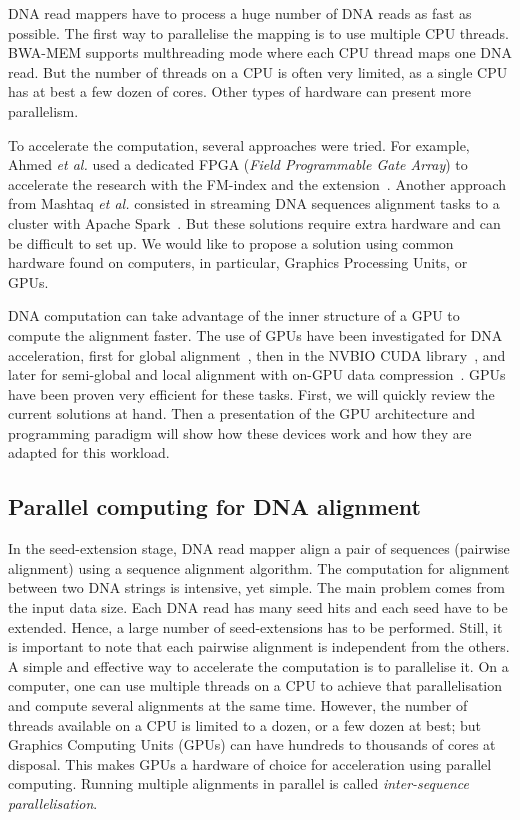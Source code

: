 DNA read mappers have to process a huge number of DNA reads as fast as possible. The first way to parallelise the mapping is to use multiple CPU threads. BWA-MEM supports multhreading mode where each CPU thread maps one DNA read. But the number of threads on a CPU is often very limited, as a single CPU has at best a few dozen of cores. Other types of hardware can present more parallelism.

To accelerate the computation, several approaches were tried. For example, Ahmed \emph{et al.} used a dedicated FPGA (\emph{Field Programmable Gate Array}) to accelerate the research with the FM-index and the extension~\cite{Ahmed:FPGA}. Another approach from Mashtaq \emph{et al.} consisted in streaming DNA sequences alignment tasks to a cluster with Apache Spark~\cite{Mushtaq:spark}. But these solutions require extra hardware and can be difficult to set up. We would like to propose a solution using common hardware found on computers, in particular, Graphics Processing Units, or GPUs.

DNA computation can take advantage of the inner structure of a GPU to compute the alignment faster. The use of GPUs have been investigated for DNA acceleration, first for global alignment~\cite{gpualignglobal}, then in the NVBIO CUDA library~\cite{nvidia:nvbio}, and later for semi-global and local alignment with on-GPU data compression~\cite{Ahmed:gasal}. GPUs have been proven very efficient for these tasks. First, we will quickly review the current solutions at hand. Then a presentation of the GPU architecture and programming paradigm will show how these devices work and how they are adapted for this workload.

\subsection{Parallel computing for DNA alignment}
In the seed-extension stage, DNA read mapper align a pair of sequences (pairwise alignment) using a sequence alignment algorithm.
The computation for alignment between two DNA strings is intensive, yet simple. The main problem comes from the input data size. Each DNA read has many seed hits and each seed have to be extended. Hence, a large number of seed-extensions has to be performed. Still, it is important to note that each pairwise alignment is independent from the others. A simple and effective way to accelerate the computation is to parallelise it. On a computer, one can use multiple threads on a CPU to achieve that parallelisation and compute several alignments at the same time. However, the number of threads available on a CPU is limited to a dozen, or a few dozen at best; but Graphics Computing Units (GPUs) can have hundreds to thousands of cores at disposal. This makes GPUs a hardware of choice for acceleration using parallel computing. Running multiple alignments in parallel is called \emph{inter-sequence parallelisation}. 

